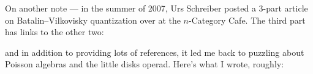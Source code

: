 \documentclass{article}
\def\tightlist{}
\renewcommand{\texttt}[1]{%
  \begingroup
  \ttfamily
  \begingroup\lccode`~=`/\lowercase{\endgroup\def~}{/\discretionary{}{}{}}%
  \begingroup\lccode`~=`[\lowercase{\endgroup\def~}{[\discretionary{}{}{}}%
  \begingroup\lccode`~=`.\lowercase{\endgroup\def~}{.\discretionary{}{}{}}%
  \catcode`/=\active\catcode`[=\active\catcode`.=\active
  \scantokens{#1\noexpand}%
  \endgroup
}
\begin{document}
On another note --- in the summer of 2007, Urs Schreiber posted a 3-part
article on Batalin--Vilkovisky quantization over at the \(n\)-Category
Cafe. The third part has links to the other two:


and in addition to providing lots of references, it led me back to
puzzling about Poisson algebras and the little disks operad. Here's what
I wrote, roughly:
\end{document}

